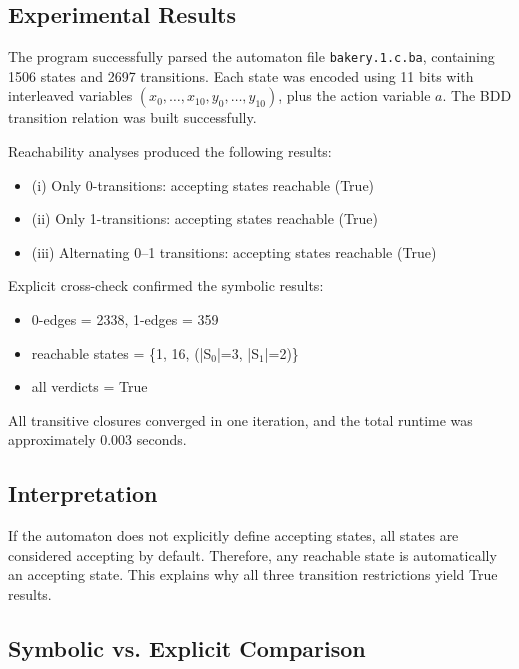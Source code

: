 \documentclass{article}
\begin{document}
\subsection*{Experimental Results}

The program successfully parsed the automaton file \texttt{bakery.1.c.ba},
containing 1506 states and 2697 transitions.
Each state was encoded using 11 bits with interleaved variables
$(x_0,\dots,x_{10},y_0,\dots,y_{10})$, plus the action variable $a$.
The BDD transition relation was built successfully.

Reachability analyses produced the following results:

\begin{itemize}
  \item (i) Only 0-transitions: accepting states reachable (True)
  \item (ii) Only 1-transitions: accepting states reachable (True)
  \item (iii) Alternating 0–1 transitions: accepting states reachable (True)
\end{itemize}

Explicit cross-check confirmed the symbolic results:
\begin{itemize}
  \item 0-edges = 2338, 1-edges = 359
  \item reachable states = \{1, 16, (|S$_0$|=3, |S$_1$|=2)\}
  \item all verdicts = True
\end{itemize}

All transitive closures converged in one iteration,
and the total runtime was approximately 0.003 seconds.



\subsection*{Interpretation}

If the automaton does not explicitly define accepting states,
all states are considered accepting by default.
Therefore, any reachable state is automatically an accepting state.
This explains why all three transition restrictions yield True results.



\subsection*{Symbolic vs. Explicit Comparison}
\end{document}
